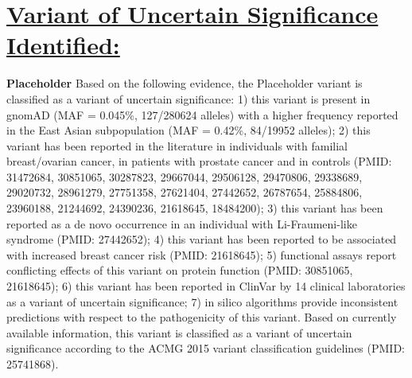 \documentclass[11pt]{extarticle}
\begin{document}
\section*{\underline {Variant of Uncertain Significance Identified:}\newline}
{\bf Placeholder}
\newline
Based on the following evidence, the Placeholder variant is classified as a variant of uncertain significance: 1) this variant is present in gnomAD (MAF = 0.045\%, 127/280624 alleles) with a higher frequency reported in the East Asian subpopulation (MAF = 0.42\%, 84/19952 alleles); 2) this variant has been reported in the literature in individuals with familial breast/ovarian cancer, in patients with prostate cancer and in controls (PMID: 31472684, 30851065, 30287823, 29667044, 29506128, 29470806, 29338689, 29020732, 28961279, 27751358, 27621404, 27442652, 26787654, 25884806, 23960188, 21244692, 24390236, 21618645, 18484200); 3) this variant has been reported as a de novo occurrence in an individual with Li-Fraumeni-like syndrome (PMID: 27442652); 4) this variant has been reported to be associated with increased breast cancer risk (PMID: 21618645); 5) functional assays report conflicting effects of this variant on protein function (PMID: 30851065, 21618645); 6) this variant has been reported in ClinVar by 14 clinical laboratories as a variant of uncertain significance; 7) in silico algorithms provide inconsistent predictions with respect to the pathogenicity of this variant. Based on currently available information, this variant is classified as a variant of uncertain significance according to the ACMG 2015 variant classification guidelines (PMID: 25741868). 
\newline
\newline
\newline
\end{document}
